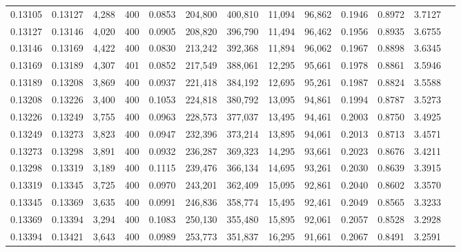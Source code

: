\begin{tabular}{rrrrrrrrrrrrr}
0.13105 & 0.13127 &  4,288 &   400 &                                     0.0853 & 204,800 & 400,810 &  11,094 &  96,862 & 0.1946 & 0.8972 & 3.7127 \\
0.13127 & 0.13146 &  4,020 &   400 &                                     0.0905 & 208,820 & 396,790 &  11,494 &  96,462 & 0.1956 & 0.8935 & 3.6755 \\
0.13146 & 0.13169 &  4,422 &   400 &                                     0.0830 & 213,242 & 392,368 &  11,894 &  96,062 & 0.1967 & 0.8898 & 3.6345 \\
0.13169 & 0.13189 &  4,307 &   401 &                                     0.0852 & 217,549 & 388,061 &  12,295 &  95,661 & 0.1978 & 0.8861 & 3.5946 \\
0.13189 & 0.13208 &  3,869 &   400 &                                     0.0937 & 221,418 & 384,192 &  12,695 &  95,261 & 0.1987 & 0.8824 & 3.5588 \\
0.13208 & 0.13226 &  3,400 &   400 &                                     0.1053 & 224,818 & 380,792 &  13,095 &  94,861 & 0.1994 & 0.8787 & 3.5273 \\
0.13226 & 0.13249 &  3,755 &   400 &                                     0.0963 & 228,573 & 377,037 &  13,495 &  94,461 & 0.2003 & 0.8750 & 3.4925 \\
0.13249 & 0.13273 &  3,823 &   400 &                                     0.0947 & 232,396 & 373,214 &  13,895 &  94,061 & 0.2013 & 0.8713 & 3.4571 \\
0.13273 & 0.13298 &  3,891 &   400 &                                     0.0932 & 236,287 & 369,323 &  14,295 &  93,661 & 0.2023 & 0.8676 & 3.4211 \\
0.13298 & 0.13319 &  3,189 &   400 &                                     0.1115 & 239,476 & 366,134 &  14,695 &  93,261 & 0.2030 & 0.8639 & 3.3915 \\
0.13319 & 0.13345 &  3,725 &   400 &                                     0.0970 & 243,201 & 362,409 &  15,095 &  92,861 & 0.2040 & 0.8602 & 3.3570 \\
0.13345 & 0.13369 &  3,635 &   400 &                                     0.0991 & 246,836 & 358,774 &  15,495 &  92,461 & 0.2049 & 0.8565 & 3.3233 \\
0.13369 & 0.13394 &  3,294 &   400 &                                     0.1083 & 250,130 & 355,480 &  15,895 &  92,061 & 0.2057 & 0.8528 & 3.2928 \\
0.13394 & 0.13421 &  3,643 &   400 &                                     0.0989 & 253,773 & 351,837 &  16,295 &  91,661 & 0.2067 & 0.8491 & 3.2591 \\

\end{tabular}
